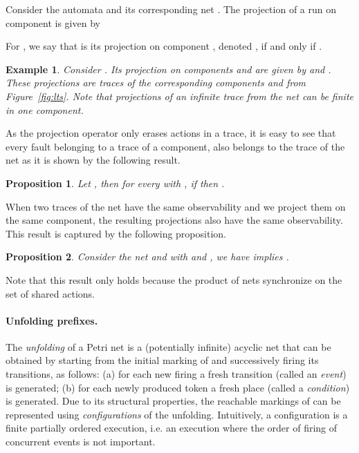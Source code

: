 \documentclass[a4paper]{article}
\newtheorem{exmp}{Example}
\newtheorem{prop}{Proposition}
\begin{document}
Consider the automata  and its corresponding net . The projection of a run on component  is given by


For , we say that  is its projection on component , denoted , if and only if .

\begin{exmp}
  Consider . Its projection on components  and  are given by  and . These projections are traces of the corresponding components  and  from Figure~\ref{fig:lts}. Note that projections of an infinite trace from the net can be finite in one component.
\end{exmp}

As the projection operator only erases actions in a trace, it is easy to see that every fault belonging to a trace of a component, also belongs to the trace of the net as it is shown by the following result.

\begin{prop} 
  Let , then for every  with , if  then .
  \label{prop:fault_proj}
\end{prop}

When two traces of the net have the same observability and we project them on the same component, the resulting projections also have the same observability. This result is captured by the following proposition.

\begin{prop}
  Consider the net  and  with  and , we have  implies 
  \label{prop:obs}.
\end{prop}

Note that this result only holds because the product of nets synchronize on the set of shared actions.

\paragraph{Unfolding prefixes.}

The \emph{unfolding} of a Petri net  is a (potentially infinite) acyclic net that can be obtained by starting from the initial marking of  and successively firing its transitions, as follows: (a) for each new firing a fresh transition (called an \emph{event}) is generated; (b) for each newly produced token a fresh place (called a \emph{condition}) is generated. Due to its structural properties, the reachable markings of  can be represented using \emph{configurations} of the unfolding. Intuitively, a configuration is a finite partially ordered execution, i.e. an execution where the order of firing of concurrent events is not important.
\end{document}
